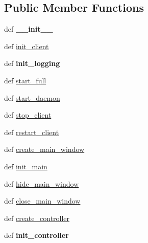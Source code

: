 \subsection*{Public Member Functions}
\begin{DoxyCompactItemize}
\item 
\hypertarget{classcommotion__client_1_1commotion__client_1_1CommotionClientApplication_af131eabc9f0007d5d8541228988767ca}{def {\bfseries \+\_\+\+\_\+init\+\_\+\+\_\+}}\label{classcommotion__client_1_1commotion__client_1_1CommotionClientApplication_af131eabc9f0007d5d8541228988767ca}

\item 
def \hyperlink{classcommotion__client_1_1commotion__client_1_1CommotionClientApplication_adbf0b01d9e64047a4ad7971161d457b1}{init\+\_\+client}
\item 
\hypertarget{classcommotion__client_1_1commotion__client_1_1CommotionClientApplication_aecf3bce1170d5ec27871002233b8a389}{def {\bfseries init\+\_\+logging}}\label{classcommotion__client_1_1commotion__client_1_1CommotionClientApplication_aecf3bce1170d5ec27871002233b8a389}

\item 
def \hyperlink{classcommotion__client_1_1commotion__client_1_1CommotionClientApplication_a61c21aa424a10a251b3a2902b3740bbe}{start\+\_\+full}
\item 
def \hyperlink{classcommotion__client_1_1commotion__client_1_1CommotionClientApplication_a640d7d7d8306a2e6ee7b66fa8281f5f5}{start\+\_\+daemon}
\item 
def \hyperlink{classcommotion__client_1_1commotion__client_1_1CommotionClientApplication_a63104a06ba20d9b679c22b542fd90c94}{stop\+\_\+client}
\item 
def \hyperlink{classcommotion__client_1_1commotion__client_1_1CommotionClientApplication_af40aa0ed2df54b7edb7f3e474b336a63}{restart\+\_\+client}
\item 
def \hyperlink{classcommotion__client_1_1commotion__client_1_1CommotionClientApplication_a726949d610a2bd566d1f3745b74c7b42}{create\+\_\+main\+\_\+window}
\item 
def \hyperlink{classcommotion__client_1_1commotion__client_1_1CommotionClientApplication_a1ed67f317a1ddd84b65ef39a848732bf}{init\+\_\+main}
\item 
def \hyperlink{classcommotion__client_1_1commotion__client_1_1CommotionClientApplication_a6b8f22fc6aaab6e6105f7832a7bf11b9}{hide\+\_\+main\+\_\+window}
\item 
def \hyperlink{classcommotion__client_1_1commotion__client_1_1CommotionClientApplication_ac3f5efd893879314eb1fbcf7e4d90192}{close\+\_\+main\+\_\+window}
\item 
def \hyperlink{classcommotion__client_1_1commotion__client_1_1CommotionClientApplication_a6afd07f83f02108c04a682120bd5a298}{create\+\_\+controller}
\item 
\hypertarget{classcommotion__client_1_1commotion__client_1_1CommotionClientApplication_ac6c092a34ad6d9174135769da24671f5}{def {\bfseries init\+\_\+controller}}\label{classcommotion__client_1_1commotion__client_1_1CommotionClientApplication_ac6c092a34ad6d9174135769da24671f5}


\end{DoxyCompactItemize}
